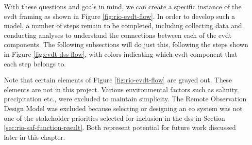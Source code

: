 %

With these questions and goals in mind, we can create a specific instance of the \ac{evdt} framing as shown in Figure \ref{fig:rio-evdt-flow}. In order to develop such a model, a number of steps remain to be completed, including collecting data and conducting analyses to understand the connections between each of the \ac{evdt} components. The following subsections will do just this, following the steps shown in Figure \ref{fig:evdt-dss-flow}, with colors indicating which \ac{evdt} component that each step belongs to. 

Note that certain elements of Figure \ref{fig:rio-evdt-flow} are grayed out. These elements are not in this project. Various environmental factors such as salinity, precipitation etc., were excluded to maintain simplicity. The Remote Observation Design Model was excluded because selecting or designing an \ac{eo} system was not one of the stakeholder priorities selected for inclusion in the \ac{dss} in Section \ref{sec:rio-saf-function-result}. Both represent potential for future work discussed later in this chapter.

